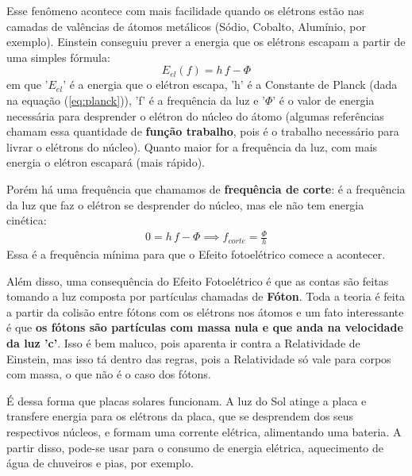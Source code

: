 \documentclass[12pt]{extarticle}
\newcommand{\<}{\langle}
\renewcommand{\>}{\rangle}
\theoremstyle{definition}
\begin{document}
Esse fenômeno acontece com mais facilidade quando os elétrons estão nas camadas de valências de átomos metálicos (Sódio, Cobalto, Alumínio, por exemplo). Einstein conseguiu prever a energia que os elétrons escapam a partir de uma simples fórmula:
\begin{equation}
    E_{el}(f) = h\,f - \Phi
\end{equation}
\noindent em que '$E_{el}$' é a energia que o elétron escapa, 'h' é a Constante de Planck (dada na equação (\ref{eq:planck})), 'f' é a frequência da luz e '$\Phi$' é o valor de energia necessária para desprender o elétron do núcleo do átomo (algumas referências chamam essa quantidade de \textbf{função trabalho}, pois é o trabalho necessário para livrar o elétrons do núcleo). Quanto maior for a frequência da luz, com mais energia o elétron escapará (mais rápido).

Porém há uma frequência que chamamos de \textbf{frequência de corte}: é a frequência da luz que faz o elétron se desprender do núcleo, mas ele não tem energia cinética:
\begin{align*}
    0 = h\,f - \Phi \implies f_{corte} = \frac{\Phi}{h}
\end{align*}
Essa é a frequência mínima para que o Efeito fotoelétrico comece a acontecer.

Além disso, uma consequência do Efeito Fotoelétrico é que as contas são feitas tomando a luz composta por partículas chamadas de \textbf{Fóton}. Toda a teoria é feita a partir da colisão entre fótons com os elétrons nos átomos e um fato interessante é que \textbf{os fótons são partículas com massa nula e que anda na velocidade da luz 'c'}. Isso é bem maluco, pois aparenta ir contra a Relatividade de Einstein, mas isso tá dentro das regras, pois a Relatividade só vale para corpos com massa, o que não é o caso dos fótons.

É dessa forma que placas solares funcionam. A luz do Sol atinge a placa e transfere energia para os elétrons da placa, que se desprendem dos seus respectivos núcleos, e formam uma corrente elétrica, alimentando uma bateria. A partir disso, pode-se usar para o consumo de energia elétrica, aquecimento de água de chuveiros e pias, por exemplo.
\end{document}
